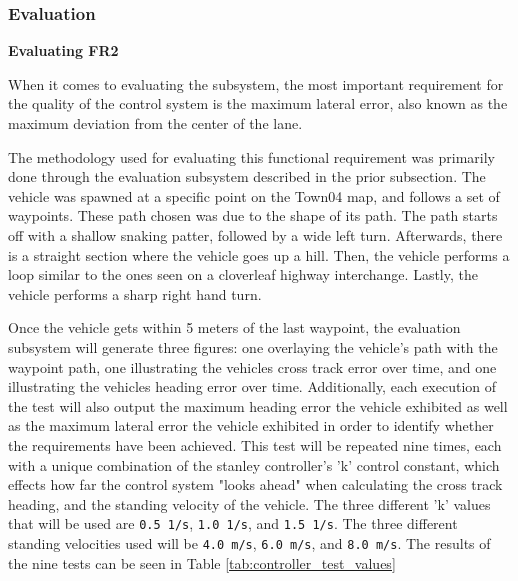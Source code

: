 \documentclass[titlepage,draft]{article}
\begin{document}
{\subsubsection{Evaluation}
\textbf{Evaluating FR2}

When it comes to evaluating the subsystem, the most important requirement for the quality of the control system is the maximum lateral error, also known as the maximum deviation from the center of the lane.

The methodology used for evaluating this functional requirement was primarily done through the evaluation subsystem described in the prior subsection. The vehicle was spawned at a specific point on the Town04 map, and follows a set of waypoints. These path chosen was due to the shape of its path. The path starts off with a shallow snaking patter, followed by a wide left turn. Afterwards, there is a straight section where the vehicle goes up a hill. Then, the vehicle performs a loop similar to the ones seen on a cloverleaf highway interchange. Lastly, the vehicle performs a sharp right hand turn.

Once the vehicle gets within 5 meters of the last waypoint, the evaluation subsystem will generate three figures: one overlaying the vehicle's path with the waypoint path, one illustrating the vehicles cross track error over time, and one illustrating the vehicles heading error over time. Additionally, each execution of the test will also output the maximum heading error the vehicle exhibited as well as the maximum lateral error the vehicle exhibited in order to identify whether the requirements have been achieved. This test will be repeated nine times, each with a unique combination of the stanley controller's 'k' control constant, which effects how far the control system "looks ahead" when calculating the cross track heading, and the standing velocity of the vehicle. The three different 'k' values that will be used are \texttt{0.5 1/s}, \texttt{1.0 1/s}, and \texttt{1.5 1/s}. The three different standing velocities used will be \texttt{4.0 m/s}, \texttt{6.0 m/s}, and \texttt{8.0 m/s}. The results of the nine tests can be seen in Table \ref{tab:controller_test_values}

}
\end{document}
